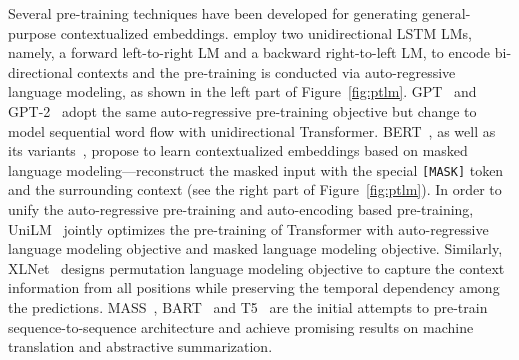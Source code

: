 Several pre-training techniques have been developed for generating general-purpose contextualized embeddings. \citet{peters-etal-2017-semi,peters-etal-2018-deep} employ two unidirectional LSTM LMs, namely, a forward left-to-right LM and a backward right-to-left LM, to encode bi-directional contexts and the pre-training is conducted via auto-regressive language modeling, as shown in the left part of Figure~\ref{fig:ptlm}. GPT~\citep{radford2018improving} and GPT-2~\citep{radford2019language} adopt the same auto-regressive pre-training objective but change to model sequential word flow with unidirectional Transformer. BERT~\citep{devlin-etal-2019-bert}, as well as its variants~\citep{conneau2019cross,liu2019roberta,wang2019structbert,joshi-etal-2020-spanbert}, propose to learn contextualized embeddings based on masked language modeling---reconstruct the masked input with the special \texttt{[MASK]} token and the surrounding context (see the right part of Figure~\ref{fig:ptlm}). In order to unify the auto-regressive pre-training and auto-encoding based pre-training, UniLM~\citep{dong2019unified} jointly optimizes the pre-training of Transformer with auto-regressive language modeling objective and masked language modeling objective. Similarly, XLNet~\citep{yang2019xlnet} designs permutation language modeling objective to capture the context information from all positions while preserving the temporal dependency among the predictions. MASS~\citep{song2019mass}, BART~\citep{lewis-etal-2020-bart} and T5~\citep{raffel2019exploring} are the initial attempts to pre-train sequence-to-sequence architecture and achieve promising results on machine translation and abstractive summarization. 


